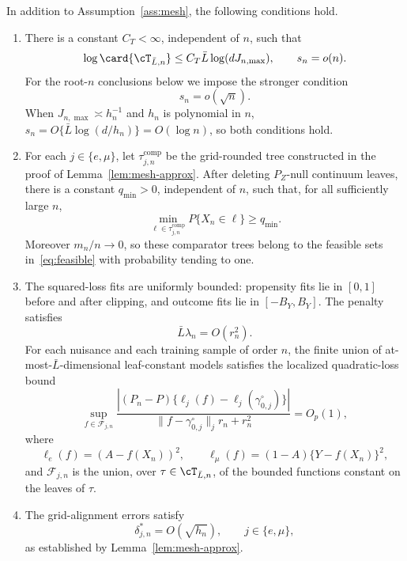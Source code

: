 \begin{assumption}
\label{ass:grid-inference}
In addition to Assumption~\ref{ass:mesh}, the following conditions hold.

\begin{enumerate}[label=(U\arabic*),leftmargin=*]

\item\label{u:entropy}
There is a constant $C_T<\infty$, independent of $n$, such that
\[
  \log\card{\cT_{\bar L,n}}
  \le C_T\bar L\log(dJ_{n,\max}),
  \qquad
  s_n=o(n).
\]
For the root-$n$ conclusions below we impose the stronger condition
\[
  s_n=o(\sqrt n).
  \tag{U1$^+$}\label{eq:u1plus}
\]
When $J_{n,\max}\asymp h_n^{-1}$ and $h_n$ is polynomial in $n$,
$s_n=O\{\bar L\log(d/h_n)\}=O(\log n)$, so both conditions hold.

\item\label{u:comparator}
For each $j\in\{e,\mu\}$, let $\tau^{\mathrm{comp}}_{j,n}$ be the grid-rounded
tree constructed in the proof of Lemma~\ref{lem:mesh-approx}.  After deleting
$P_Z$-null continuum leaves, there is a constant $q_{\min}>0$, independent of
$n$, such that, for all sufficiently large $n$,
\[
  \min_{\ell\in\tau^{\mathrm{comp}}_{j,n}}P\{X_n\in\ell\}
  \ge q_{\min}.
\]
Moreover $m_n/n\to0$, so these comparator trees belong to the feasible sets
in~\eqref{eq:feasible} with probability tending to one.

\item\label{u:bernstein}
The squared-loss fits are uniformly bounded: propensity fits lie in $[0,1]$
before and after clipping, and outcome fits lie in $[-B_Y,B_Y]$.  The penalty
satisfies
\[
  \bar L\lambda_n=O(r_n^2).
\]
For each nuisance and each training sample of order $n$, the finite union of
at-most-$\bar L$-dimensional leaf-constant models satisfies the localized
quadratic-loss bound
\begin{equation}\label{eq:grid-bernstein}
 \sup_{f\in\mathcal F_{j,n}}
 \frac{\left|(P_n-P)\{\ell_j(f)-\ell_j(\gamma_{0,j}^\circ)\}\right|}
      {\|f-\gamma_{0,j}^\circ\|_j r_n+r_n^2}
 =O_p(1),
\end{equation}
where
\[
 \ell_e(f)=(A-f(X_n))^2,\qquad
 \ell_\mu(f)=(1-A)\{Y-f(X_n)\}^2,
\]
and $\mathcal F_{j,n}$ is the union, over
$\tau\in\cT_{\bar L,n}$, of the bounded functions constant on the leaves of
$\tau$.

\item\label{u:approx}
The grid-alignment errors satisfy
\[
  \delta^*_{j,n}=O(\sqrt{h_n}),
  \qquad j\in\{e,\mu\},
\]
as established by Lemma~\ref{lem:mesh-approx}.

\end{enumerate}
\end{assumption}

